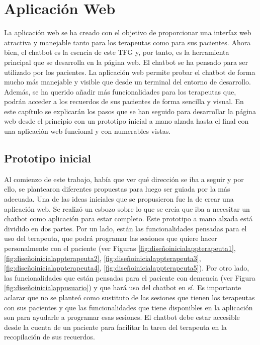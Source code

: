 \chapter{Aplicación Web}
\label{cap:aplicacionWeb}

La aplicación web se ha creado con el objetivo de proporcionar una interfaz web atractiva y manejable tanto para los terapeutas como para sus pacientes. Ahora bien, el chatbot es la esencia de este TFG y, por tanto, es la herramienta principal que se desarrolla en la página web. El chatbot se ha pensado para ser utilizado por los pacientes. La aplicación web permite probar el chatbot de forma mucho más manejable y visible que desde un terminal del entorno de desarrollo. Además, se ha querido añadir más funcionalidades para los terapeutas que, podrán acceder a los recuerdos de sus pacientes de forma sencilla y visual. En este capítulo se explicarán los pasos que se han seguido para desarrollar la página web desde el principio con un prototipo inicial a mano alzada hasta el final con una aplicación web funcional y con numerables vistas. 


\section{Prototipo inicial}

Al comienzo de este trabajo, había que ver qué dirección se iba a seguir y por ello, se plantearon diferentes propuestas para luego ser guiada por la más adecuada. Una de las ideas iniciales que se propusieron fue la de crear una aplicación web. Se realizó un esbozo sobre lo que se creía que iba a necesitar un chatbot como aplicación para estar completo. Este prototipo a mano alzada está dividido en dos partes. Por un lado, están las funcionalidades pensadas para el uso del terapeuta, que podrá programar las sesiones que quiere hacer personalmente con el paciente (ver Figuras \ref{fig:diseñoinicialappterapeuta1}, \ref{fig:diseñoinicialappterapeuta2}, \ref{fig:diseñoinicialappterapeuta3}, \ref{fig:diseñoinicialappterapeuta4}, \ref{fig:diseñoinicialappterapeuta5}). Por otro lado, las funcionalidades que están pensadas para el paciente con demencia (ver Figura \ref{fig:diseñoinicialappusuario}) y que hará uso del chatbot en sí. Es importante aclarar que no se planteó como sustituto de las sesiones que tienen los terapeutas con sus  pacientes y que las funcionalidades que tiene disponibles en la aplicación son para ayudarle a programar esas sesiones. El chatbot debe estar accesible desde la cuenta de un paciente para facilitar la tarea del terapeuta en la recopilación de sus recuerdos.

